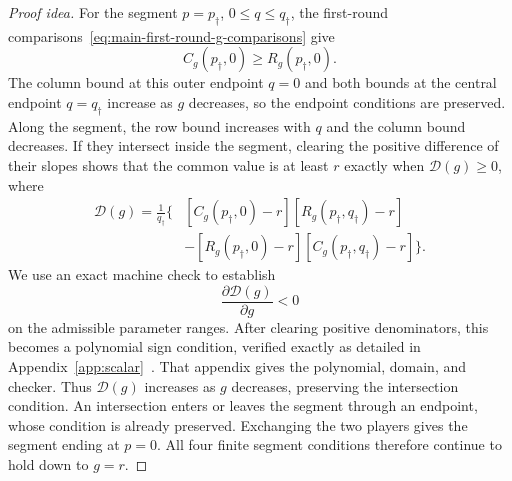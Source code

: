 \documentclass[11pt]{article}
\theoremstyle{remark}
\theoremstyle{plain}
\begin{document}
\begin{proof}[Proof idea]
For the segment $p=p_\dagger$, $0\le q\le q_\dagger$, the
first-round comparisons~\eqref{eq:main-first-round-g-comparisons}
give
\[
 C_g(p_\dagger,0)\ge R_g(p_\dagger,0).
\]
The column bound at this outer endpoint $q=0$ and both bounds at the
central endpoint $q=q_\dagger$ increase as $g$ decreases, so the endpoint
conditions are preserved. Along the segment, the row bound increases
with $q$ and the column bound decreases. If they intersect inside
the segment, clearing the positive difference of their slopes
shows that the common value is at least $r$ exactly when
$\mathcal D(g)\ge0$, where
\begin{equation}
 \begin{aligned}
 \mathcal D(g)=\frac1{q_\dagger}\bigl\{&
 [C_g(p_\dagger,0)-r][R_g(p_\dagger,q_\dagger)-r]\\
 &-[R_g(p_\dagger,0)-r][C_g(p_\dagger,q_\dagger)-r]\bigr\}.
 \end{aligned}
 \label{eq:main-g-intersection-condition}
\end{equation}
We use an exact machine check to establish
\[
 \frac{\partial\mathcal D(g)}{\partial g}<0
\]
on the admissible parameter ranges. After clearing positive
denominators, this becomes a polynomial sign condition, verified
exactly as detailed in Appendix~\ref{app:scalar}~\cite{garloff1986}.
That appendix gives the polynomial, domain, and checker.
Thus $\mathcal D(g)$ increases
as $g$ decreases, preserving the intersection condition.
An intersection enters or leaves the segment through an endpoint,
whose condition is already preserved. Exchanging the two players
gives the segment ending at $p=0$. All four finite segment conditions
therefore continue to hold down to $g=r$.
\end{proof}
\end{document}
